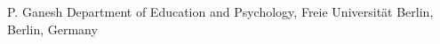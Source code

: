 
                {P. Ganesh}
                {Department of Education and Psychology, Freie Universität Berlin, Berlin, Germany}
                